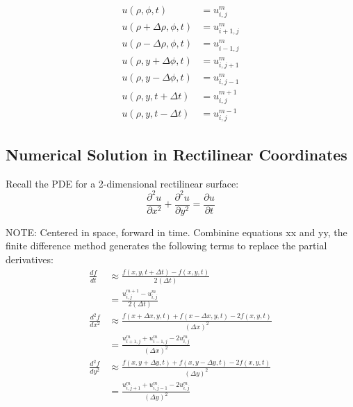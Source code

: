 \documentclass[11pt]{article}
\begin{document}
\begin{equation}
\begin{split} 
u(\rho, \phi, t) &= u_{i,j}^m \\
u(\rho + \Delta \rho, \phi, t)  &= u_{i + 1 ,j}^m \\
u(\rho - \Delta \rho, \phi, t) &= u_{i - 1 ,j}^m \\
u(\rho, y + \Delta \phi, t) &= u_{i,j + 1}^m \\
u(\rho, y - \Delta \phi, t) &= u_{i,j - 1}^m \\
u(\rho, y, t + \Delta t) &= u_{i,j}^{m + 1} \\
u(\rho, y, t - \Delta t) &= u_{i,j}^{m - 1} 
\end{split}
\end{equation}

    \hypertarget{numerical-solution-in-rectilinear-coordinates}{%
\subsection{Numerical Solution in Rectilinear
Coordinates}\label{numerical-solution-in-rectilinear-coordinates}}

    Recall the PDE for a 2-dimensional rectilinear surface: \begin{equation}
\frac {\partial^2 u}{\partial x^2} + \frac {\partial^2 u}{\partial y^2} = \frac {\partial u}{\partial t}
\end{equation}

NOTE: Centered in space, forward in time. Combinine equations xx and yy,
the finite difference method generates the following terms to replace
the partial derivatives: \begin{equation}
\begin{split} 
\frac{df}{dt} &\approx \frac{f(x, y, t + \Delta t) - f(x, y, t)}{2 (\Delta t)} \\
&= \frac{u_{i,j}^{m + 1} - u_{i,j}^{m}}{2 (\Delta t)} \\
\frac{d^2f}{dx^2} &\approx \frac{f(x + \Delta x, y, t) + f(x - \Delta x, y, t) - 2 f(x, y, t)}{(\Delta x)^2} \\
&= \frac{u_{i + 1 ,j}^m + u_{i - 1 ,j}^m - 2 u_{i,j}^m}{(\Delta x)^2} \\
\frac{d^2f}{dy^2} &\approx \frac{f(x, y + \Delta y, t) + f(x, y - \Delta y, t) - 2 f(x, y, t)}{(\Delta y)^2} \\
&= \frac{u_{i,j + 1}^m + u_{i,j - 1}^m - 2 u_{i,j}^m}{(\Delta y)^2}  
\end{split} 
\end{equation}
\end{document}
